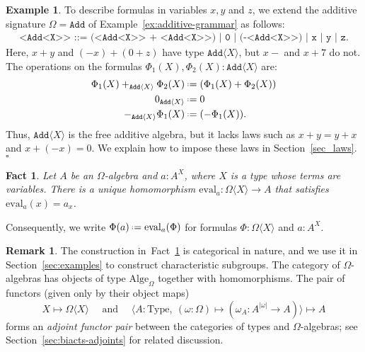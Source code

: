 \documentclass{amsart}
\numberwithin{lstfloat}{section}
\newcommand{\Free}[2]{#1\langle #2\rangle}
\newcommand{\defeq}{\mathrel{\hstretch{.13}{=}\hspace{.2ex}{=}}}
\newcommand{\eval}{{\rm eval}}
\newcommand{\exqed}{\hfill $\square$}
\newtheorem{fact}[thm]{Fact}
\theoremstyle{definition}
\newtheorem{ex}[thm]{Example}
\newtheorem{rem}[thm]{Remark}
\theoremstyle{remark}
\numberwithin{equation}{section}
\begin{document}
\begin{ex}
  To describe formulas in variables $x,y$ and $z$, 
we extend the additive signature
  $\Omega =\texttt{Add}$ of Example~\ref{ex:additive-grammar} as follows: 
   \begin{equation*}
     \label{eq:free-grammar}
     \begin{split}
     \texttt{<Add<X>>} \texttt{ ::= (<Add<X>> + <Add<X>>)  | 0 | (-<Add<X>>) |  x | y | z}.
     \end{split}
   \end{equation*}
   Here, $x+y$ and $(-x)+(0+z)$ have type $\texttt{Add}\langle X\rangle$,
   but $x-$ and $x+7$ do not. 
   The operations on the formulas $\Phi_1(X),\Phi_2(X):\Free{\texttt{Add}}{X}$ are:
   \begin{align*}
      \Phi_1(X) +_{\Free{\texttt{Add}}{X}} \Phi_2(X) 
      & \defeq ( \Phi_1(X) + \Phi_2(X) )\\
      0_{\Free{\texttt{Add}}{X}} 
      & \defeq 0\\
      -_{\Free{\texttt{Add}}{X}} \Phi_1(X) 
      & \defeq (-\Phi_1(X)).
   \end{align*}
   Thus, $\texttt{Add}\langle X\rangle$ is the free additive algebra,  but it
   lacks laws such as $x+y = y+x$ and $x + (-x) = 0$. We explain how to impose
   these laws in  Section~\ref{sec_laws}. 
   \exqed
 \end{ex}


 \begin{fact}
  \label{fact:ump}
    Let $A$ be an $\Omega$-algebra and $a:A^X$, where 
    $X$ is a type whose terms are variables. 
    There is a unique homomorphism $\mathrm{eval}_a:\Omega\langle
    X\rangle \to A$ that satisfies 
    $\mathrm{eval}_a(x)  = a_x $.
\end{fact}
\noindent
Consequently, we write $\Phi(a)\defeq \eval_a(\Phi)$ for formulas
$\Phi:\Free{\Omega}{X}$ and $a:A^X$.

\begin{rem}
  The construction in~Fact~\ref{fact:ump} is categorical in nature, and we use
  it in Section~\ref{sec:examples} to construct characteristic subgroups. The
  category of $\Omega$-algebras has objects of type $\mathrm{Alge}_{\Omega}$
  together with homomorphisms. The pair of functors (given only by their object
  maps)
  \[
    X\mapsto \Free{\Omega}{X}\quad\text{ and }\quad
    \langle A:\mathrm{Type},\ (\omega:\Omega)\mapsto (\omega_A:A^{|\omega|}\to A)\rangle\mapsto A
  \]
  forms an \emph{adjoint functor pair} between the categories of types and
  $\Omega$-algebras; see Section~\ref{sec:biacts-adjoints} for related discussion. 
\end{rem}
\end{document}
